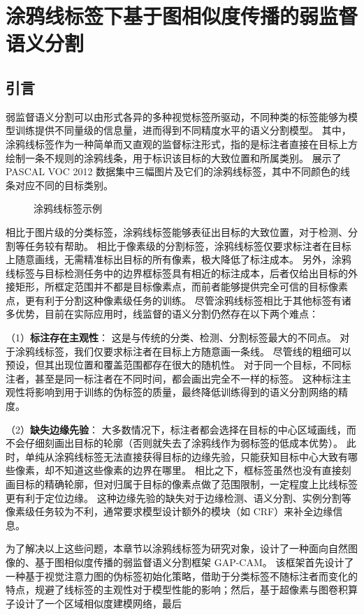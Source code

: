 \chapter{涂鸦线标签下基于图相似度传播的弱监督语义分割}
\label{chp:scribble}
\section{引言}
弱监督语义分割可以由形式各异的多种视觉标签所驱动，不同种类的标签能够为模型训练提供不同量级的信息量，进而得到不同精度水平的语义分割模型。
其中，涂鸦线标签作为一种简单而又直观的监督标注形式，指的是标注者直接在目标上方绘制一条不规则的涂鸦线条，用于标识该目标的大致位置和所属类别。
展示了 PASCAL VOC 2012 数据集中三幅图片及它们的涂鸦线标签，其中不同颜色的线条对应不同的目标类别。
\par
\begin{figure}[h]
\centering
{}
\hfil
{}
\hfil
{}
\caption{涂鸦线标签示例}
\label{fig:scribble-samples}
\end{figure}
\par
相比于图片级的分类标签，涂鸦线标签能够表征出目标的大致位置，对于检测、分割等任务较有帮助。
相比于像素级的分割标签，涂鸦线标签仅要求标注者在目标上随意画线，无需精准标出目标的所有像素，极大降低了标注成本。
另外，涂鸦线标签与目标检测任务中的边界框标签具有相近的标注成本，后者仅给出目标的外接矩形，所框定范围并不都是目标像素点，而前者能够提供完全可信的目标像素点，更有利于分割这种像素级任务的训练。
尽管涂鸦线标签相比于其他标签有诸多优势，目前在实际应用时，线监督的语义分割仍然存在以下两个难点：
\par
（1）\textbf{标注存在主观性}：
这是与传统的分类、检测、分割标签最大的不同点。
对于涂鸦线标签，我们仅要求标注者在目标上方随意画一条线。
尽管线的粗细可以预设，但其出现位置和覆盖范围都存在很大的随机性。
对于同一个目标，不同标注者，甚至是同一标注者在不同时间，都会画出完全不一样的标签。
这种标注主观性将影响到用于训练的伪标签的质量，最终降低训练得到的语义分割网络的精度。
\par
（2）\textbf{缺失边缘先验}：
大多数情况下，标注者都会选择在目标的中心区域画线，而不会仔细刻画出目标的轮廓（否则就失去了涂鸦线作为弱标签的低成本优势）。
此时，单纯从涂鸦线标签无法直接获得目标的边缘先验，只能获知目标中心大致有哪些像素，却不知道这些像素的边界在哪里。
相比之下，框标签虽然也没有直接刻画目标的精确轮廓，但对归属于目标的像素点做了范围限制，一定程度上比线标签更有利于定位边缘。
这种边缘先验的缺失对于边缘检测、语义分割、实例分割等像素级任务较为不利，通常要求模型设计额外的模块（如 CRF\cite{krahenbuhl2011efficient}）来补全边缘信息。
\par
为了解决以上这些问题，本章节以涂鸦线标签为研究对象，设计了一种面向自然图像的、基于图相似度传播的弱监督语义分割框架 GAP-CAM。
该框架首先设计了一种基于视觉注意力图的伪标签初始化策略，借助于分类标签不随标注者而变化的特点，规避了线标签的主观性对于模型性能的影响；然后，基于超像素与图卷积算子设计了一个区域相似度建模网络，最后
